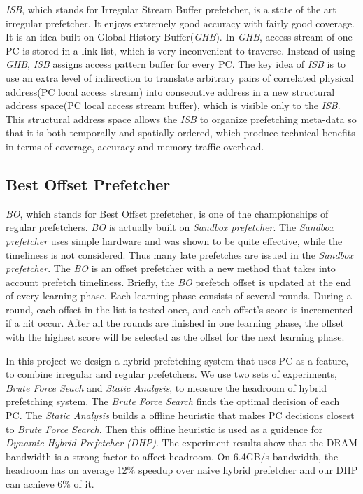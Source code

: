   \emph{ISB}, which stands for Irregular Stream Buffer prefetcher, is a state of the art irregular prefetcher. It enjoys extremely good accuracy with fairly good coverage. It is an idea built on Global History Buffer(\emph{GHB})\cite{ghbpaper}.
In \emph{GHB}, access stream of one PC is stored in a link list, which is very inconvenient to traverse. Instead of using \emph{GHB}, \emph{ISB} assigns access pattern buffer for every PC.
The key idea of \emph{ISB} is to use an extra level of indirection to translate arbitrary pairs of correlated physical address(PC local access stream) into consecutive address in a new structural address space(PC local access stream buffer), which is visible only to the \emph{ISB}.
This structural address space allows the \emph{ISB} to organize prefetching meta-data so that it is both temporally and spatially ordered, which produce technical benefits in terms of coverage, accuracy and memory traffic overhead.

  \subsection{Best Offset Prefetcher}
  \label{sec:bointro}

  \emph{BO}, which stands for Best Offset prefetcher, is one of the championships of regular prefetchers. \emph{BO} is actually built on \emph{Sandbox prefetcher}\cite{sandboxpaper}.
 The \emph{Sandbox prefetcher} uses simple hardware and was shown to be quite effective, while the timeliness is not considered.
 Thus many late prefetches are issued in the \emph{Sandbox prefetcher}.
 The \emph{BO} is an offset prefetcher with a new method that takes into account prefetch timeliness. Briefly, the \emph{BO} prefetch offset is updated at the end of every learning phase. Each learning phase consists of several rounds.
 During a round, each offset in the list is tested once, and each offset's score is incremented if a hit occur.
 After all the rounds are finished in one learning phase, the offset with the highest score will be selected as the offset for the next learning phase.


 In this project we design a hybrid prefetching system that uses PC as a feature, to combine irregular and regular prefetchers.
We use two sets of experiments, \emph{Brute Force Seach} and \emph{Static Analysis}, to measure the headroom of hybrid prefetching system. The \emph{Brute Force Search} finds the optimal decision of each PC.
The \emph{Static Analysis} builds a offline heuristic that makes PC decisions closest to \emph{Brute Force Search}.
Then this offline heuristic is used as a guidence for \emph{Dynamic Hybrid Prefetcher (DHP)}.
The experiment results show that the DRAM bandwidth is a strong factor to affect headroom. On 6.4GB/s bandwidth, the headroom has on average 12\% speedup over naive hybrid prefetcher and our DHP can achieve 6\% of it. \par

